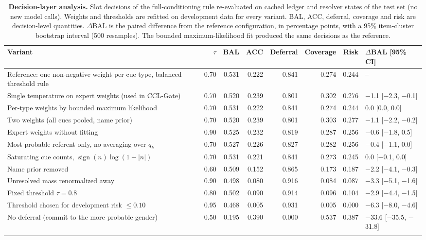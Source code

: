 \begin{table}[!htbp]
\caption{\textbf{Decision-layer analysis.} Slot decisions of the full-conditioning rule re-evaluated on cached ledger and resolver states of the test set (no new model calls). Weights and thresholds are refitted on development data for every variant. BAL, ACC, deferral, coverage and risk are decision-level quantities. $\Delta$BAL is the paired difference from the reference configuration, in percentage points, with a 95\% item-cluster bootstrap interval (500 resamples). The bounded maximum-likelihood fit produced the same decisions as the reference.}\label{edtab:lab}
\scriptsize
\setlength{\tabcolsep}{2pt}
\begin{tabular*}{\textwidth}{@{\extracolsep\fill}L{3.3cm}rrrrrrl@{}}
\toprule
Variant & $\tau$ & BAL & ACC & Deferral & Coverage & Risk & $\Delta$BAL [95\% CI] \\
\midrule
Reference: one non-negative weight per cue type, balanced threshold rule & 0.70 & 0.531 & 0.222 & 0.841 & 0.274 & 0.244 & -- \\
Single temperature on expert weights (used in CCL-Gate) & 0.70 & 0.520 & 0.239 & 0.801 & 0.302 & 0.276 & $-$1.1 [$-$2.3, $-$0.1] \\
Per-type weights by bounded maximum likelihood & 0.70 & 0.531 & 0.222 & 0.841 & 0.274 & 0.244 & 0.0 [0.0, 0.0] \\
Two weights (all cues pooled, name prior) & 0.70 & 0.520 & 0.239 & 0.801 & 0.303 & 0.277 & $-$1.1 [$-$2.2, $-$0.2] \\
Expert weights without fitting & 0.90 & 0.525 & 0.232 & 0.819 & 0.287 & 0.256 & $-$0.6 [$-$1.8, 0.5] \\
Most probable referent only, no averaging over $q_k$ & 0.70 & 0.527 & 0.226 & 0.827 & 0.282 & 0.256 & $-$0.4 [$-$1.1, 0.0] \\
Saturating cue counts, $\operatorname{sign}(n)\log(1+|n|)$ & 0.70 & 0.531 & 0.221 & 0.841 & 0.273 & 0.245 & 0.0 [$-$0.1, 0.0] \\
Name prior removed & 0.60 & 0.509 & 0.152 & 0.865 & 0.173 & 0.187 & $-$2.2 [$-$4.1, $-$0.3] \\
Unresolved mass renormalized away & 0.90 & 0.498 & 0.080 & 0.916 & 0.084 & 0.087 & $-$3.3 [$-$5.1, $-$1.6] \\
Fixed threshold $\tau=0.8$ & 0.80 & 0.502 & 0.090 & 0.914 & 0.096 & 0.104 & $-$2.9 [$-$4.4, $-$1.5] \\
Threshold chosen for development risk $\le0.10$ & 0.95 & 0.468 & 0.005 & 0.931 & 0.005 & 0.000 & $-$6.3 [$-$8.0, $-$4.6] \\
No deferral (commit to the more probable gender) & 0.50 & 0.195 & 0.390 & 0.000 & 0.537 & 0.387 & $-$33.6 [$-$35.5, $-$31.8] \\
\botrule
\end{tabular*}
\end{table}

